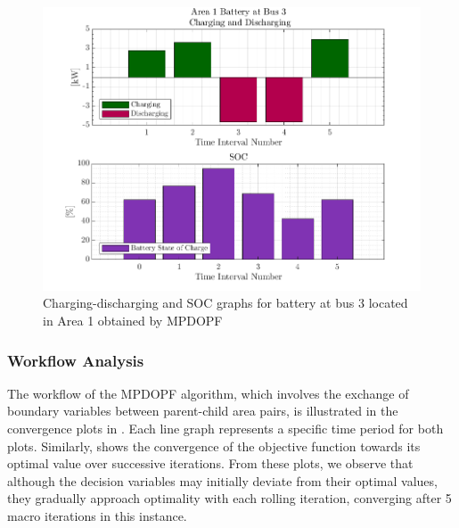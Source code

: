 \documentclass[../../outputs/main.tex]{subfiles}
\begin{document}
\begin{figure}[t]
    \centering
    \includegraphics[width=\linewidth]{../figures/T5-pv20-batt30-genCost/dopf/BatteryPlots/macroItr_5_genCost_Battery_1_alpha_0.001.png}
    \vspace{-5mm}
    \caption{Charging-discharging and SOC graphs for battery at bus 3 located in Area 1 obtained by MPDOPF}
    \label{fig:batt-plot-dopf-5-20-30-genCost}
    \vspace{-3mm}
\end{figure}

\subsubsection{Workflow Analysis}
The workflow of the MPDOPF algorithm, which involves the exchange of boundary variables between parent-child area pairs, is illustrated in the convergence plots in . Each line graph represents a specific time period for both plots. Similarly,  shows the convergence of the objective function towards its optimal value over successive iterations. From these plots, we observe that although the decision variables may initially deviate from their optimal values, they gradually approach optimality with each rolling iteration, converging after 5 macro iterations in this instance.
\end{document}
